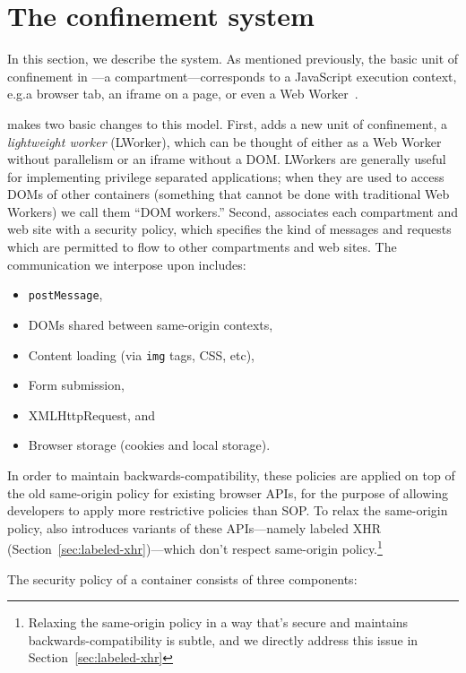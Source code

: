 \section{The \sys{} confinement system}
\label{sec:system}

In this section, we describe the \sys{} system.
%
As mentioned previously, the basic unit of confinement in \sys{}---a
compartment---corresponds to a JavaScript execution context, e.g.\@ a
browser tab, an iframe on a page, or even a Web Worker~\cite{workers}.

\sys{} makes two basic changes to this model.
%
First, \sys{} adds a new unit of confinement, a \emph{lightweight
worker} (LWorker), which can be thought of either as a Web Worker
without parallelism or an iframe without a DOM\@.
%
LWorkers are generally useful for implementing privilege separated applications;
when they are used to access DOMs of other containers (something that
cannot be done with traditional Web Workers) we call them ``DOM workers.''
%
Second, \sys{} associates each compartment and web site with a security policy,
which specifies the kind of messages and requests which are permitted to
flow to other compartments and web sites.
%
The communication we interpose upon includes:

\begin{itemize}
    \item {\tt postMessage},
    \item DOMs shared between same-origin contexts,
    \item Content loading (via {\tt img} tags, CSS, etc),
    \item Form submission,
    \item XMLHttpRequest, and
    \item Browser storage (cookies and local storage).
\end{itemize}

In order to maintain backwards-compatibility, these policies are
applied on top of the old same-origin policy for existing browser APIs,
for the purpose of allowing developers to apply more restrictive policies than
SOP\@.
%
To relax the same-origin policy, \sys{} also introduces variants of
these APIs---namely labeled XHR (Section~\ref{sec:labeled-xhr})---which don't
respect same-origin policy.\footnote{Relaxing the same-origin policy in a way that's
secure and maintains backwards-compatibility is subtle, and we directly
address this issue in Section~\ref{sec:labeled-xhr}}

The security policy of a container consists of three components:

